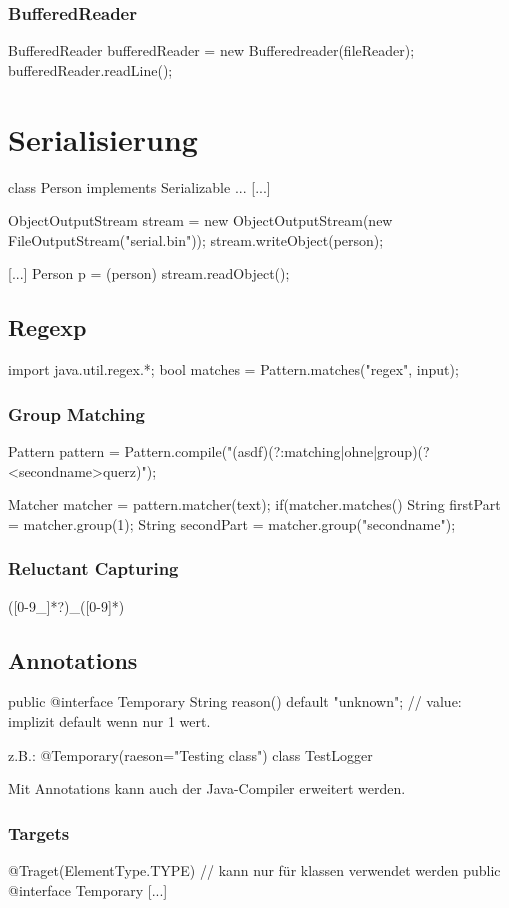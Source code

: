 {	\subsubsection{BufferedReader}
	BufferedReader bufferedReader = new Bufferedreader(fileReader);
	bufferedReader.readLine();
	
\section{Serialisierung}

	class Person implements Serializable { ... }
	[...]
	
	ObjectOutputStream stream = new ObjectOutputStream(new FileOutputStream("serial.bin"));
	stream.writeObject(person);
	
	[...]
	Person p = (person)	stream.readObject();
	
\subsection{Regexp}
	import java.util.regex.*;
	bool matches = Pattern.matches("regex", input);
	
	
	\subsubsection{Group Matching}
	Pattern pattern = Pattern.compile("(asdf)(?:matching|ohne|group)(?<secondname>querz)");
	
	Matcher matcher = pattern.matcher(text);
	if(matcher.matches(){
		String firstPart = matcher.group(1);
		String secondPart = matcher.group("secondname");
	}
	
	\subsubsection{Reluctant Capturing}
		([0-9_]*?)_([0-9]*)
		
		
\subsection{Annotations}
	public @interface Temporary {
		String reason() default "unknown";
		// value: implizit default wenn nur 1 wert.
	}
	
	
	z.B.: @Temporary(raeson="Testing class") class TestLogger { }
	
	
	Mit Annotations kann auch der Java-Compiler erweitert werden.
	\subsubsection{Targets}
	@Traget(ElementType.TYPE) // kann nur für klassen verwendet werden
	public @interface Temporary { [...] }
	

}
